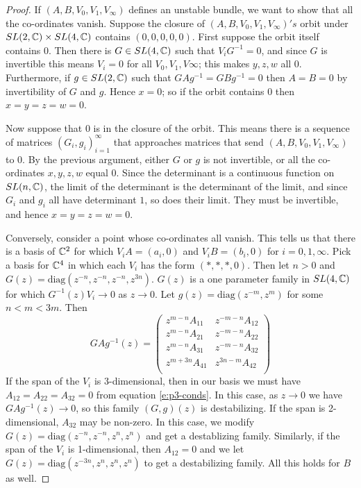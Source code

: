 	\begin{proof}
		If $(A,B,V_0,V_1,V_\infty)$ defines an unstable bundle, we want to show that all the co-ordinates vanish. Suppose the closure of $(A,B,V_0,V_1,V_\infty)'s$ orbit under $SL(2,\mathbb{C})\times SL(4,\mathbb{C})$ contains $(0,0,0,0,0)$. First suppose the orbit itself contains $0$. Then there is $G\in SL(4,\mathbb{C})$ such that $V_i G^{-1} =0$, and since $G$ is invertible this means $V_i = 0$ for all $V_0,V_1,V\infty$; this makes $y,z,w$ all 0. Furthermore, if $g\in SL(2,\mathbb{C})$ such that $GAg^{-1} = GBg^{-1} =0$ then $A=B=0$ by invertibility of $G$ and $g$. Hence $x=0$; so if the orbit contains $0$ then $x=y=z=w=0$. 
		
		Now suppose that $0$ is in the closure of the orbit. This means there is a sequence of matrices $(G_i,g_i)_{i=1}^\infty$ that approaches matrices that send $(A,B,V_0,V_1,V_\infty)$ to $0$. By the previous argument, either $G$ or $g$ is not invertible, or all the co-ordinates $x,y,z,w$ equal 0. Since the determinant is a continuous function on $SL(n,\mathbb{C})$, the limit of the determinant is the determinant of the limit, and since $G_i$ and $g_i$ all have determinant $1$, so does their limit. They must be invertible, and hence $x=y=z=w=0$.\vspace{1em}
		
		Conversely, consider a point whose co-ordinates all vanish. This tells us that there is a basis of $\mathbb{C}^2$ for which $V_i A = (a_i,0)$ and $V_i B = (b_i ,0)$ for $i=0,1,\infty$. Pick a basis for $\mathbb{C}^4$ in which each $V_i$ has the form $(\ast,\ast,\ast,0)$. Then let $n>0$ and $G(z) = \text{diag}(z^{-n}, z^{-n}, z^{-n}, z^{3n})$. $G(z)$ is a one parameter family in $SL(4,\mathbb{C})$ for which $G^{-1}(z)V_i \to 0$ as $z\to 0$. Let $g(z) = \text{diag}(z^{-m}, z^{m})$ for some $n < m < 3m$. Then
		\begin{equation}
			GAg^{-1}(z) =
			\begin{pmatrix}
			z^{m-n} A_{11} & z^{-m-n}A_{12}\\
			z^{m-n} A_{21} & z^{-m-n}A_{22}\\
			z^{m-n} A_{31} & z^{-m-n}A_{32}\\
			z^{m+3n} A_{41} & z^{3n-m}A_{42}\\
			\end{pmatrix} 
		\end{equation}
		If the span of the $V_i$ is 3-dimensional, then in our basis we must have $A_{12}=A_{22}=A_{32}=0$ from equation \ref{e:p3-conds}. In this case, as $z\to 0$ we have $GAg^{-1}(z) \to 0$, so this family $(G,g)(z)$ is destabilizing. If the span is 2-dimensional, $A_{32}$ may be non-zero. In this case, we modify $G(z) = \text{diag}(z^{-n}, z^{-n}, z^n, z^n)$ and get a destablizing family. Similarly, if the span of the $V_i$ is 1-dimensional, then $A_{12}=0$ and we let $G(z) = \text{diag}(z^{-3n}, z^n, z^n, z^n)$ to get a destabilizing family. All this holds for $B$ as well.
		

\end{proof}
